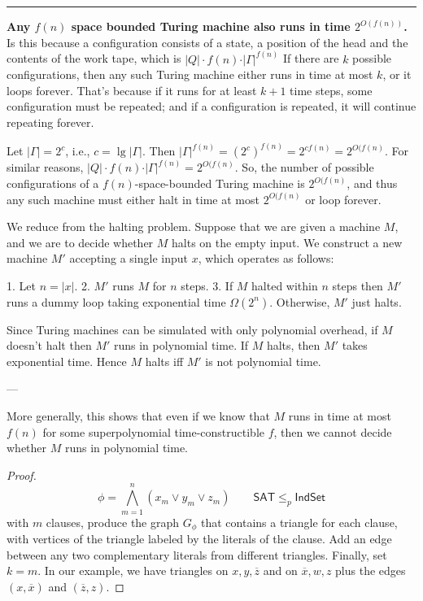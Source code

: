 \documentclass[10pt,landscape]{article}
\theoremstyle{plain}%
\theoremstyle{definition}
\theoremstyle{remark}
\begin{document}
\begin{multicols}{3}
\hrule
 \textbf{Any $f(n)$ space bounded Turing machine also runs in time $2^{O(f(n))}$.}
Is this because a configuration consists of a state, a position of the head and the contents of the work tape, which is $\vert Q \vert \cdot f(n) \cdot \vert \Gamma \vert ^{f(n)}$
If there are $k$ possible configurations, then any such Turing machine either runs in time at most $k$, or it loops forever.  That's because if it runs for at least $k+1$ time steps, some configuration must be repeated; and if a configuration is repeated, it will continue repeating forever.

Let $|\Gamma|=2^c$, i.e., $c = \lg |\Gamma|$.  Then $|\Gamma|^{f(n)} = (2^c)^{f(n)} = 2^{c f(n)} = 2^{O(f(n)}$.  For similar reasons, $\vert Q \vert \cdot f(n) \cdot \vert \Gamma \vert ^{f(n)} = 2^{O(f(n)}$.  So, the number of possible configurations of a $f(n)$-space-bounded Turing machine is $2^{O(f(n)}$, and thus any such machine must either halt in time at most $2^{O(f(n)}$ or loop forever.\\

 We reduce from the halting problem. Suppose that we are given a machine $M$, and we are to decide whether $M$ halts on the empty input. We construct a new machine $M'$ accepting a single input $x$, which operates as follows:

1. Let $n = |x|$.
2. $M'$ runs $M$ for $n$ steps.
3. If $M$ halted within $n$ steps then $M'$ runs a dummy loop taking exponential time $\Omega(2^n)$. Otherwise, $M'$ just halts.

Since Turing machines can be simulated with only polynomial overhead, if $M$ doesn't halt then $M'$ runs in polynomial time. If $M$ halts, then $M'$ takes exponential time. Hence $M$ halts iff $M'$ is not polynomial time.

---

More generally, this shows that even if we know that $M$ runs in time at most $f(n)$ for some superpolynomial time-constructible $f$, then we cannot decide whether $M$ runs in polynomial time.\begin{proof}
$$\phi=\bigwedge_{m=1}^{n}(x_m\vee y_m\vee z_m)\qquad \mathsf{SAT}\leq_p \mathsf{IndSet}$$
with $m$ clauses, produce the graph $G_\phi$ that contains a triangle for each clause, with vertices of the triangle labeled by the literals of the clause. Add an edge between any two complementary literals from different triangles. Finally, set $k=m$. In our example, we have triangles on $x,y,\overline{z}$ and on $\overline{x},w,z$ plus the edges $(x,\overline{x})$ and $(\overline{z},z)$.


\end{proof}
\end{multicols}
\end{document}
